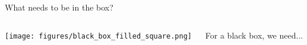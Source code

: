 \documentclass[xcolor=table,aspectratio=169]{beamer}
\numberwithin{equation}{section}
\begin{document}
\begin{frame}{What needs to be in the box?}

   \begin{columns}
      \begin{column}{0.5\textwidth}
         \texttt{[image: figures/black\_box\_filled\_square.png]}
      \end{column}
      \begin{column}{0.5\textwidth}
         For a black box, we need...

         \vspace{1ex}

         \vspace{1ex}
      \end{column}
   \end{columns}
\end{frame}
\end{document}
